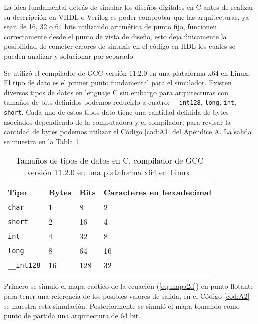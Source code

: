          La idea fundamental detrás de simular los diseños digitales en C antes de realizar su descripción en VHDL o Verilog es poder comprobar que las arquitecturas, ya sean de 16, 32 o 64 bits utilizando aritmética de punto fijo, funcionen correctamente desde el punto de vista de diseño, esto deja únicamente la posibilidad de cometer errores de sintaxis en el código en HDL los cuales se pueden analizar y solucionar por separado.

        Se utilizó el compilador de GCC versión 11.2.0 en una plataforma x64 en Linux. El tipo de dato es el primer punto fundamental para el simulador. Existen diversos tipos de datos en lenguaje C sin embargo para arquitecturas con tamaños de bits definidos podemos reducirlo a cuatro: \verb|__int128|, \verb|long|, \verb|int|, \verb|short|. Cada uno de estos tipos dato tiene una cantidad definida de bytes asociados dependiendo de la computadora y el compilador, para revisar la cantidad de bytes podemos utilizar el Código \ref{cod:A1} del Apéndice A. La salida se muestra en la Tabla \ref{tab:tipos_de_datos}.

        \begin{table}[htbp]
            \centering
            \caption{Tamaños de tipos de datos en C, compilador de GCC versión 11.2.0 en una plataforma x64 en Linux.}
            \begin{tabular}{|l|l|l|l|}
                \hline
                \rowcolor{lightgray} Tipo  & Bytes & Bits & Caracteres en hexadecimal\\
                \hline
                \verb|char|      & 1  & 8    & 2  \\
                \hline
                \verb|short|     & 2  & 16   & 4  \\
                \hline
                \verb|int|       & 4  & 32   & 8  \\
                \hline
                \verb|long|      & 8  & 64   & 16 \\
                \hline
                \verb|__int128|  & 16 & 128  & 32 \\
                \hline
            \end{tabular}
            \label{tab:tipos_de_datos}
        \end{table}
       
       Primero se simuló el mapa caótico de la ecuación (\ref{eq:mapa2d}) en punto flotante para tener una referencia de los posibles valores de salida, en el Código \ref{cod:A2} se muestra esta simulación. Posteriormente se simuló el mapa tomando como punto de partida una arquitectura de 64 bit. 
        

